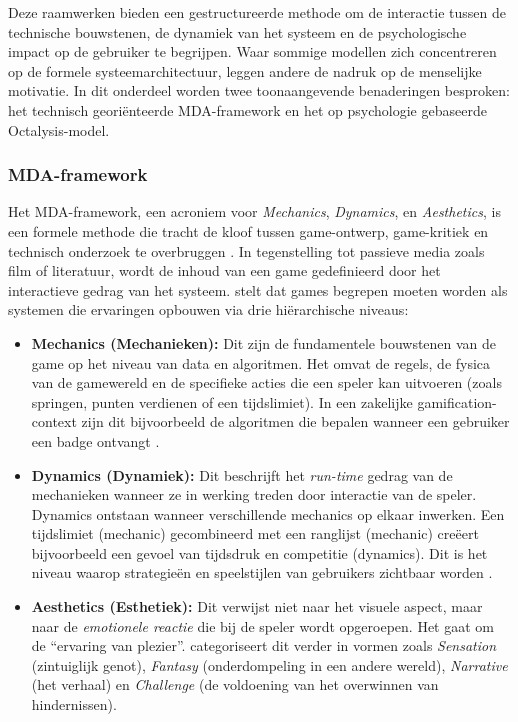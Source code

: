 Deze raamwerken bieden een gestructureerde methode om de interactie tussen de technische bouwstenen, de dynamiek van het systeem en de psychologische impact op de gebruiker te begrijpen. 
Waar sommige modellen zich concentreren op de formele systeemarchitectuur, leggen andere de nadruk op de menselijke motivatie. 
In dit onderdeel worden twee toonaangevende benaderingen besproken: het technisch georiënteerde MDA-framework en het op psychologie gebaseerde Octalysis-model.

\subsubsection{MDA-framework}
Het MDA-framework, een acroniem voor \textit{Mechanics}, \textit{Dynamics}, en \textit{Aesthetics}, is een formele methode die tracht de kloof tussen game-ontwerp, game-kritiek en technisch onderzoek te overbruggen \autocite{Hunicke2004}.
In tegenstelling tot passieve media zoals film of literatuur, wordt de inhoud van een game gedefinieerd door het interactieve gedrag van het systeem. 
\textcite{Hunicke2004} stelt dat games begrepen moeten worden als systemen die ervaringen opbouwen via drie hiërarchische niveaus:

\begin{itemize}
    \item \textbf{Mechanics (Mechanieken):} Dit zijn de fundamentele bouwstenen van de game op het niveau van data en algoritmen. 
    Het omvat de regels, de fysica van de gamewereld en de specifieke acties die een speler kan uitvoeren (zoals springen, punten verdienen of een tijdslimiet). 
    In een zakelijke gamification-context zijn dit bijvoorbeeld de algoritmen die bepalen wanneer een gebruiker een badge ontvangt \autocite{Hunicke2004}.

    \item \textbf{Dynamics (Dynamiek):} Dit beschrijft het \textit{run-time} gedrag van de mechanieken wanneer ze in werking treden door interactie van de speler. 
    Dynamics ontstaan wanneer verschillende mechanics op elkaar inwerken. 
    Een tijdslimiet (mechanic) gecombineerd met een ranglijst (mechanic) creëert bijvoorbeeld een gevoel van tijdsdruk en competitie (dynamics). 
    Dit is het niveau waarop strategieën en speelstijlen van gebruikers zichtbaar worden \autocite{Hunicke2004}.

    \item \textbf{Aesthetics (Esthetiek):} Dit verwijst niet naar het visuele aspect, maar naar de \textit{emotionele reactie} die bij de speler wordt opgeroepen. 
    Het gaat om de \enquote{ervaring van plezier}. 
    \textcite{Hunicke2004} categoriseert dit verder in vormen zoals \textit{Sensation} (zintuiglijk genot), \textit{Fantasy} (onderdompeling in een andere wereld), \textit{Narrative} (het verhaal) en \textit{Challenge} (de voldoening van het overwinnen van hindernissen).
\end{itemize}

